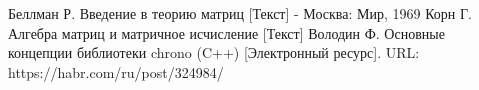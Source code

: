 %
%

\newpage
\begin{thebibliography}{}
      Беллман Р. Введение в теорию матриц [Текст] - Москва: Мир, 1969
     Корн Г. Алгебра матриц и матричное исчисление [Текст]
      Володин Ф. Основные концепции библиотеки chrono (C++) [Электронный ресурс]. URL: https://habr.com/ru/post/324984/
\end{thebibliography}

